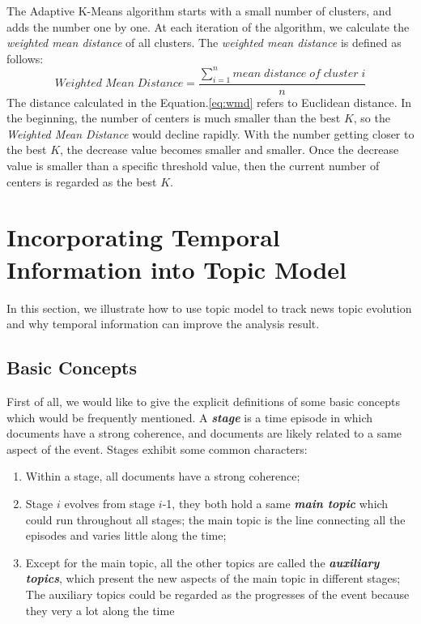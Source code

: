 \documentclass[runningheads,a4paper]{llncs}
\begin{document}
The Adaptive K-Means algorithm starts with a small number of clusters, and adds the number one by one. At each iteration of the algorithm, we calculate the \emph{weighted mean distance} of all clusters. The \emph{weighted mean distance} is defined as follows:
\begin{equation}\label{eq:wmd}
Weighted\;Mean\;Distance=\frac{\sum_{i=1}^{n}{mean\;distance\;of\;cluster\;i}}{n}
\end{equation}
The distance calculated in the Equation.\ref{eq:wmd} refers to Euclidean distance. In the beginning, the number of centers is much smaller than the best $K$, so the \emph{Weighted Mean Distance} would decline rapidly. With the number getting closer to the best $K$, the decrease value becomes smaller and smaller. Once the decrease value is smaller than a specific threshold value, then the current number of centers is regarded as the best $K$.

\section{Incorporating Temporal Information into Topic Model}
\label{section4}
In this section, we illustrate how to use topic model to track news topic evolution and why temporal information can improve the analysis result.

\subsection{Basic Concepts}
\label{section4.1}
First of all, we would like to give the explicit definitions of some basic concepts which would be frequently mentioned. A \textbf{\emph{stage}} is a time episode in which documents have a strong coherence, and documents are likely related to a same aspect of the event. Stages exhibit some common characters:
\begin{enumerate}
	\item Within a stage, all documents have a strong coherence;
	\item Stage $i$ evolves from stage $i$-1, they both hold a same \textbf{\emph{main topic}} which could run throughout all stages; the main topic is the line connecting all the episodes and varies little along the time;
	\item Except for the main topic, all the other topics are called the \textbf{\emph{auxiliary topics}}, which present the new aspects of the main topic in different stages; The auxiliary topics could be regarded as the progresses of the event because they very a lot along the time
\end{enumerate}
\end{document}
